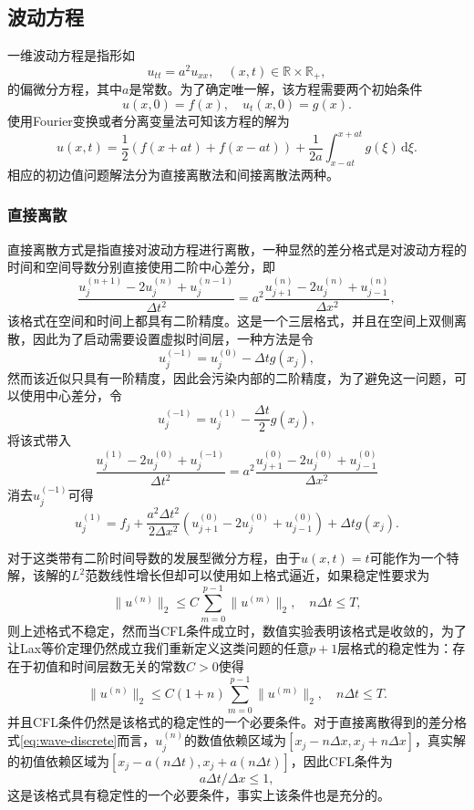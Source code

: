 \documentclass[a4paper,10pt]{ctexart}
\begin{document}
\subsection{波动方程}
一维波动方程是指形如
\begin{equation}
    u_{tt} = a^2 u_{xx},\quad (x,t)\in \mathbb{R}\times \mathbb{R}_+,
\end{equation}
的偏微分方程，其中$ a $是常数。为了确定唯一解，该方程需要两个初始条件
\[
    u(x,0) = f(x),\quad u_t(x,0) = g(x).
\]
使用Fourier变换或者分离变量法可知该方程的解为
\begin{equation}
    u(x,t) = \frac{1}{2} \left( f(x+at) + f(x-at) \right) + \frac{1}{2a} \int_{x-at}^{x+at} g(\xi) \, \mathrm{d}\xi.
\end{equation}
相应的初边值问题解法分为直接离散法和间接离散法两种。

\subsubsection{直接离散}
直接离散方式是指直接对波动方程进行离散，一种显然的差分格式是对波动方程的时间和空间导数分别直接使用二阶中心差分，即
\begin{equation}\label{eq:wave-discrete}
    \frac{u^{(n+1)}_j - 2u^{(n)}_j + u^{(n-1)}_j}{\Delta t^2} = a^2 \frac{u^{(n)}_{j+1} - 2u^{(n)}_j + u^{(n)}_{j-1}}{\Delta x^2},
\end{equation}
该格式在空间和时间上都具有二阶精度。这是一个三层格式，并且在空间上双侧离散，因此为了启动需要设置虚拟时间层，一种方法是令
\[
    u^{(-1)}_j = u^{(0)}_j - \Delta t g(x_j),
\]
然而该近似只具有一阶精度，因此会污染内部的二阶精度，为了避免这一问题，可以使用中心差分，令
\[
    u^{(-1)}_j = u^{(1)}_j - \frac{\Delta t}{2} g(x_j),
\]
将该式带入
\[
    \frac{u^{(1)}_j - 2u^{(0)}_j + u^{(-1)}_j}{\Delta t^2} = a^2 \frac{u^{(0)}_{j+1} - 2u^{(0)}_j + u^{(0)}_{j-1}}{\Delta x^2}
\]
消去$ u^{(-1)}_j $可得
\[
    u^{(1)}_j = f_j + \frac{a^2 \Delta t^2}{2\Delta x^2}(u^{(0)}_{j+1} - 2u^{(0)}_j + u^{(0)}_{j-1}) + \Delta t g(x_j).
\]

对于这类带有二阶时间导数的发展型微分方程，由于$ u(x,t)=t $可能作为一个特解，该解的$ L^2 $范数线性增长但却可以使用如上格式逼近，如果稳定性要求为
\[
    \| u^{(n)} \|_2 \leqslant  C\sum_{m=0}^{p-1}\| u^{(m)} \|_2,\quad n \Delta t\leqslant T,
\]
则上述格式不稳定，然而当CFL条件成立时，数值实验表明该格式是收敛的，为了让Lax等价定理仍然成立我们重新定义这类问题的任意$ p+1 $层格式的稳定性为：存在于初值和时间层数无关的常数$ C>0 $使得
\begin{equation}
    \| u^{(n)} \|_2 \leqslant  C(1+n)\sum_{m=0}^{p-1}\| u^{(m)} \|_2,\quad n \Delta t\leqslant T.
\end{equation}
并且CFL条件仍然是该格式的稳定性的一个必要条件。对于直接离散得到的差分格式\eqref{eq:wave-discrete}而言，$ u^{(n)}_j $的数值依赖区域为$ [x_j-n\Delta x, x_j+n\Delta x] $，真实解的初值依赖区域为$ [x_j-a(n\Delta t), x_j+a(n\Delta t)] $，因此CFL条件为
\begin{equation}
    a\Delta t / \Delta x\leqslant 1,
\end{equation}
这是该格式具有稳定性的一个必要条件，事实上该条件也是充分的。
\end{document}
